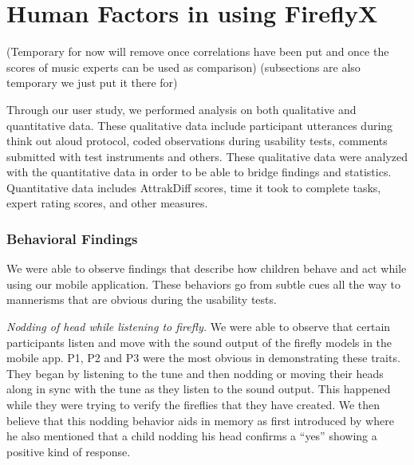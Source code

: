 \chapter{Human Factors in using FireflyX}

(Temporary for now will remove once correlations have been put and once the scores of music experts can be used as comparison)
(subsections are also temporary we just put it there for)

Through our user study, we performed analysis on both qualitative and quantitative data. These qualitative data include participant utterances during think out aloud protocol, coded observations during usability tests, comments submitted with test instruments and others. These qualitative data were analyzed with the quantitative data in order to be able to bridge findings and statistics. Quantitative data includes AttrakDiff scores, time it took to complete tasks, expert rating scores, and other measures. 

\subsection{Behavioral Findings}

We were able to observe findings that describe how children behave and act while using our mobile application. These behaviors go from subtle cues all the way to mannerisms that are obvious during the usability tests. 

\textit{Nodding of head while listening to firefly.} We were able to observe that certain participants listen and move with the sound output of the firefly models in the mobile app. P1, P2 and P3 were the most obvious in demonstrating these traits.  They began by listening to the tune and then nodding or moving their heads along in sync with the tune as they listen to the sound output. This happened while they were trying to verify the fireflies that they have created. We then believe that this nodding behavior aids in memory as first introduced by  where he also mentioned that a child nodding his head confirms a “yes” showing a positive kind of response.

